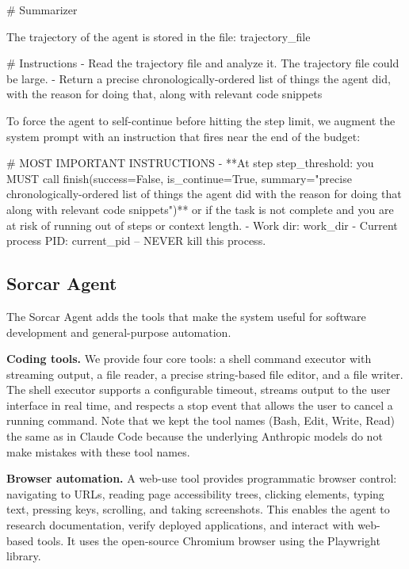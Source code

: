 \documentclass{article}
\begin{document}
\begin{prompt}
# Summarizer

The trajectory of the agent is stored in the file: {trajectory_file}

# Instructions
- Read the trajectory file and analyze it.  The trajectory file
  could be large.
- Return a precise chronologically-ordered list of things the
  agent did, with the reason for doing that, along with relevant
  code snippets
\end{prompt}

\noindent To force the agent to self-continue before hitting the step limit, we augment the system prompt with an instruction that fires near the end of the budget:

\begin{prompt}
# MOST IMPORTANT INSTRUCTIONS
- **At step {step_threshold}: you MUST call
  finish(success=False, is_continue=True,
  summary="precise chronologically-ordered list of things
  the agent did with the reason for doing that along with
  relevant code snippets")** or if the task is not complete
  and you are at risk of running out of steps or context
  length.
- Work dir: {work_dir}
- Current process PID: {current_pid} -- NEVER kill this
  process.
\end{prompt}

\subsection{Sorcar Agent}
\label{sec:sorcar-agent}

The Sorcar Agent adds the tools that make the system useful for software development and general-purpose automation.

\textbf{Coding tools.}  We provide four core tools: a shell command executor with streaming output, a file reader, a precise string-based file editor, and a file writer.  The shell executor supports a configurable timeout, streams output to the user interface in real time, and respects a stop event that allows the user to cancel a running command.  Note that we kept the tool names (Bash, Edit, Write, Read) the same as in Claude Code because the underlying Anthropic models do not make mistakes with these tool names.

\textbf{Browser automation.}  A web-use tool provides programmatic browser control: navigating to URLs, reading page accessibility trees, clicking elements, typing text, pressing keys, scrolling, and taking screenshots.  This enables the agent to research documentation, verify deployed applications, and interact with web-based tools. It uses the open-source Chromium browser using the Playwright library. 
\end{document}
